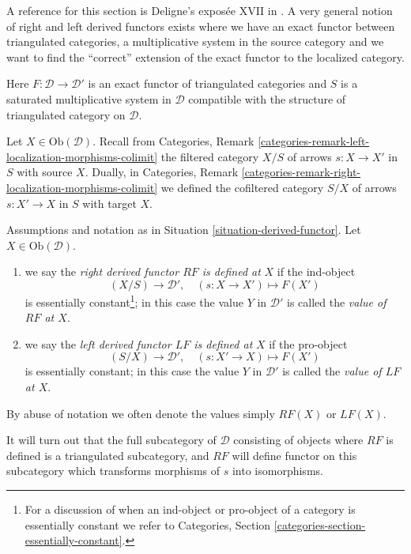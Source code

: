 \noindent
A reference for this section is Deligne's expos\'ee XVII in \cite{SGA4}.
A very general notion of right and left derived functors exists where
we have an exact functor between triangulated categories, a multiplicative
system in the source category and we want to find the ``correct'' extension
of the exact functor to the localized category.

\begin{situation}
\label{situation-derived-functor}
Here $F : \mathcal{D} \to \mathcal{D}'$ is an exact functor of triangulated
categories and $S$ is a saturated multiplicative
system in $\mathcal{D}$ compatible with the structure
of triangulated category on $\mathcal{D}$.
\end{situation}

\noindent
Let $X \in \text{Ob}(\mathcal{D})$. Recall from
Categories, Remark \ref{categories-remark-left-localization-morphisms-colimit}
the filtered category $X/S$ of arrows $s : X \to X'$ in $S$ with source $X$.
Dually, in
Categories, Remark \ref{categories-remark-right-localization-morphisms-colimit}
we defined the cofiltered category $S/X$ of arrows $s : X' \to X$ in $S$
with target $X$.

\begin{definition}
\label{definition-right-derived-functor-defined}
Assumptions and notation as in
Situation \ref{situation-derived-functor}.
Let $X \in \text{Ob}(\mathcal{D})$.
\begin{enumerate}
\item we say the {\it right derived functor $RF$ is defined at}
$X$ if the ind-object
$$
(X/S) \longrightarrow \mathcal{D}',\quad
(s : X \to X') \longmapsto F(X')
$$
is essentially constant\footnote{For a discussion of when an ind-object
or pro-object of a category is essentially constant we refer to
Categories, Section \ref{categories-section-essentially-constant}.};
in this case the value
$Y$ in $\mathcal{D}'$ is called the {\it value of $RF$ at $X$}.
\item we say the {\it left derived functor $LF$ is defined at} $X$
if the pro-object
$$
(S/X) \longrightarrow \mathcal{D}',\quad
(s: X' \to X) \longmapsto F(X')
$$
is essentially constant; in this case the value $Y$ in $\mathcal{D}'$
is called the {\it value of $LF$ at $X$}.
\end{enumerate}
By abuse of notation we often denote the values simply
$RF(X)$ or $LF(X)$.
\end{definition}

\noindent
It will turn out that the full subcategory of $\mathcal{D}$ consisting
of objects where $RF$ is defined is a triangulated subcategory, and
$RF$ will define functor on this subcategory which transforms morphisms
of $s$ into isomorphisms.

